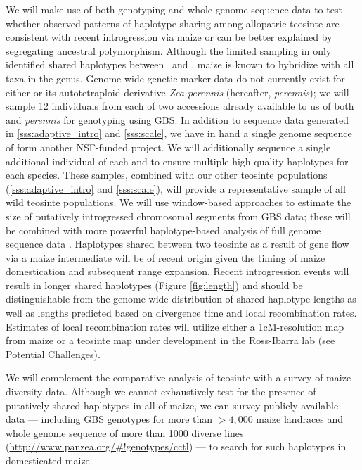 We will make use of both genotyping and whole-genome sequence data to test whether observed patterns of haplotype sharing among allopatric teosinte are consistent with recent introgression via maize or can be better explained by segregating ancestral polymorphism.
Although the limited sampling in \citet{Ross-Ibarra2009a} only identified shared haplotypes between \zm\ and \zl, maize is known to hybridize with all taxa in the genus.
Genome-wide genetic marker data do not currently exist for either \zd{} or its autotetraploid derivative \emph{Zea perennis} (hereafter, \emph{perennis}); we will sample 12 individuals from each of two accessions already available to us of both \zd{} and \emph{perennis} for genotyping using GBS. 
In addition to sequence data generated in \ref{sss:adaptive_intro} and \ref{sss:scale}, we have in hand a single genome sequence of \zd form another NSF-funded project.  
We will additionally sequence a single additional individual of each \zd{} and \zl{} to ensure multiple high-quality haplotypes for each species.
These samples, combined with our other teosinte populations (\ref{sss:adaptive_intro} and \ref{sss:scale}), will provide a representative sample of all wild teosinte populations.
We will use window-based approaches \citep[e.g.,][]{martin2015evaluating} to estimate the size of putatively introgressed chromosomal segments from GBS data; these will be combined with more powerful haplotype-based analysis of full genome sequence data \citep{price2009}.  
Haplotypes shared between two teosinte as a result of gene flow via a maize intermediate will be of recent origin given the timing of maize domestication and subsequent range expansion. 
Recent introgression events will result in longer shared haplotypes (Figure \ref{fig:length}) and should be distinguishable from the genome-wide distribution of shared haplotype lengths as well as lengths predicted based on divergence time and local recombination rates.  
Estimates of local recombination rates will utilize either a 1cM-resolution map from maize \citep{wallace2014association} or a teosinte map under development in the Ross-Ibarra lab (see Potential Challenges).

We will complement the comparative analysis of teosinte with a survey of maize diversity data.
Although we cannot exhaustively test for the presence of putatively shared haplotypes in all of maize, we can survey publicly available data --- including GBS genotypes for more than $>4,000$ maize landraces \citep{Hearne2015} and whole genome sequence of more than 1000 diverse lines (\url{http://www.panzea.org/#!genotypes/cctl}) --- to search for such haplotypes in domesticated maize.

